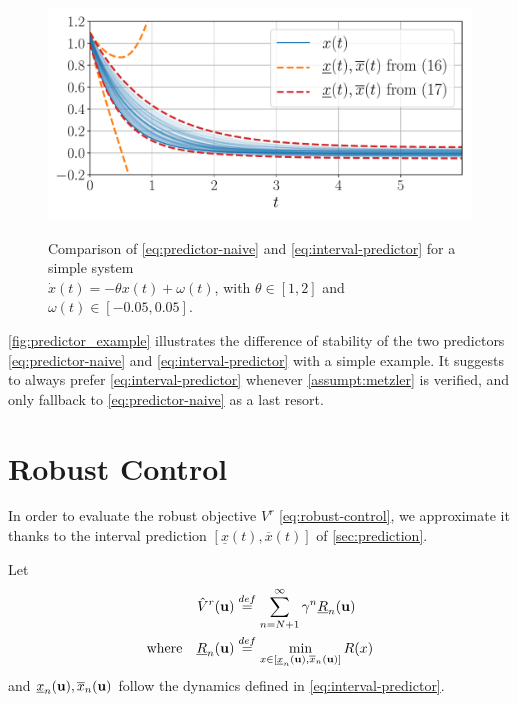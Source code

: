 \documentclass{article}
\begin{document}
\begin{figure}[tp]
	\centering
	{\includegraphics[trim={0 0.6cm 0 0.4cm}, clip, width=\linewidth]{img/interval-predictor}}
    \vspace{-0.7cm}
	\caption{Comparison of \eqref{eq:predictor-naive} and \eqref{eq:interval-predictor} for a simple system \\$\dot{x}(t)=-\theta x(t)+\omega(t)$, with $\theta\in[1, 2]$ and $\omega(t) \in [-0.05, 0.05]$.}
	\label{fig:predictor_example}
\end{figure}

\autoref{fig:predictor_example} illustrates the difference of stability of the two predictors \eqref{eq:predictor-naive} and \eqref{eq:interval-predictor} with a simple example. It suggests to always prefer \eqref{eq:interval-predictor} whenever \autoref{assumpt:metzler} is verified, and only fallback to \eqref{eq:predictor-naive} as a last resort.


\section{Robust Control}

\label{sec:control}
In order to evaluate the robust objective $V^r$ \eqref{eq:robust-control}, we approximate it thanks to the interval prediction $[\underline{x}(t), \overline{x}(t)]$ of \autoref{sec:prediction}.

\begin{definition}
	Let
\begin{align}
\label{eq:surrogate_objective} 
\hat{V}^r(\mathbf{u}) &\stackrel{def}{=} \sum_{n=N+1}^\infty \gamma^n \underline{R}_n(\mathbf{u})\\ 
\text{where}\quad\underline{R}_n(\mathbf{u}) &\stackrel{def}{=} \min_{x\in[\underline{x}_n(\mathbf{u}), \overline{x}_n(\mathbf{u})]}  R(x) \label{eq:pessimistic-rewards}
\end{align}
and $\underline{x}_n(\mathbf{u}), \overline{x}_n(\mathbf{u})$ follow the dynamics defined in \eqref{eq:interval-predictor}.
\end{definition}
\end{document}
